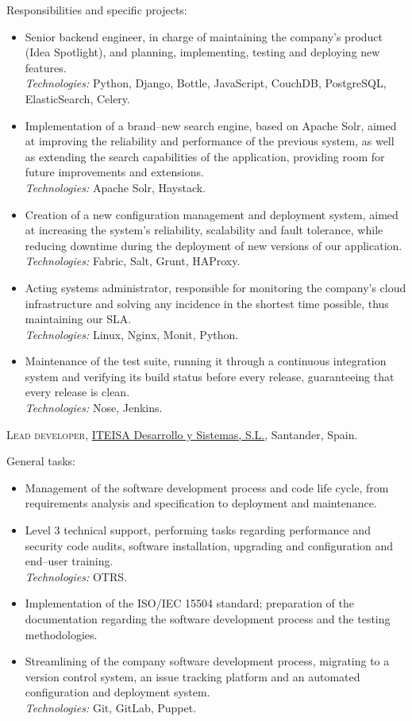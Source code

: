 \documentclass[11pt]{article}
\newcommand{\years}[1]{\marginnote{\scriptsize #1}}
\begin{document}
Responsibilities and specific projects:
\begin{itemize}
	\item  Senior backend engineer, in charge of maintaining the company's product (Idea Spotlight), and planning, implementing, testing and deploying new features.\\
	\textit{Technologies:} Python, Django, Bottle, JavaScript, CouchDB, PostgreSQL, ElasticSearch, Celery.
	\item  Implementation of a brand--new search engine, based on Apache Solr, aimed at improving the reliability and performance of the previous system, as well as extending the search capabilities of the application, providing room for future improvements and extensions.\\
	\textit{Technologies:} Apache Solr, Haystack.
	\item  Creation of a new configuration management and deployment system, aimed at increasing the system's reliability, scalability and fault tolerance, while reducing downtime during the deployment of new versions of our application.\\
	\textit{Technologies:} Fabric, Salt, Grunt, HAProxy.
	\item  Acting systems administrator, responsible for monitoring the company's cloud infrastructure and solving any incidence in the shortest time possible, thus maintaining our SLA.\\
	\textit{Technologies:} Linux, Nginx, Monit, Python.
	\item  Maintenance of the test suite, running it through a continuous integration system and verifying its build status before every release, guaranteeing that every release is clean.\\
	\textit{Technologies:} Nose, Jenkins.
\end{itemize}

\years{2011--2013}\textsc{Lead developer}, \href{http://www.iteisa.com}{ITEISA Desarrollo y Sistemas, S.L.}, Santander, Spain.

General tasks:
\begin{itemize}
	\item  Management of the software development process and code life cycle, from requirements analysis and specification to deployment and maintenance.
	\item  Level 3 technical support, performing tasks regarding performance and security code audits, software installation, upgrading and configuration and end--user training.\\
	\textit{Technologies:} OTRS.
	\item  Implementation of the ISO/IEC 15504 standard; preparation of the documentation regarding the software development process and the testing methodologies.
	\item  Streamlining of the company software development process, migrating to a version control system, an issue tracking platform and an automated configuration and deployment system.\\
	\textit{Technologies:} Git, GitLab, Puppet.
\end{itemize}
\end{document}
